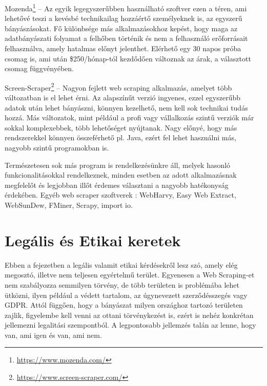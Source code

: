 Mozenda\footnote{\url{https://www.mozenda.com/}} – Az egyik legegyszerűbben használható szoftver ezen a téren, ami lehetővé teszi a kevésbé technikailag hozzáértő személyeknek is, az egyszerű bányászásokat. Fő különbsége más alkalmazásokhoz kepést, hogy maga az adatbányászati folyamat a felhőben történik és nem a felhasználó erőforrásait felhasználva, amely hatalmas előnyt jelenthet. Elérhető egy 30 napos próba csomag is, ami után \$250/hónap-tól kezdődően változnak az árak, a választott csomag függvényében.

Screen-Scraper\footnote{\url{https://www.screen-scraper.com/}} – Nagyon fejlett web scraping alkalmazás, amelyet több változatban is el lehet érni. Az alapszínűt verzió ingyenes, ezzel egyszerűbb adatok után lehet bányászni, könnyen kezelhető, nem kell sok technikai tudás hozzá. Más változatok, mint például a profi vagy vállalkozás szintű verziók már sokkal komplexebbek, több lehetőséget nyújtanak. Nagy előnyé, hogy más rendszerekkel könnyen összeférhető pl. Java, ezért fel lehet használni más, nagyobb szintű programokban is.


Természetesen sok más program is rendelkezésünkre áll, melyek hasonló funkcionalitásokkal rendelkeznek, minden esetben az adott alkalmazásnak megfelelőt és legjobban illőt érdemes választani a nagyobb hatékonyság érdekében. Egyéb web scraper szoftverek \cite{sirisuriya2015comparative}: WebHarvy, Easy Web Extract, WebSunDew, FMiner, Scrapy, import io. 


\section{Legális és Etikai keretek}

Ebben a fejezetben a legális valamit etikai kérdésekről lesz szó, amely elég megosztó, illetve nem teljesen egyértelmű terület. Egyenesen a Web Scraping-et nem szabályozza semmilyen törvény, de több területen is problémába lehet ütközni, ilyen például a védett tartalom, az úgynevezett szerződésszegés vagy GDPR. Attól függően, hogy a bányászat milyen országhoz tartozó területen zajlik, figyelembe kell venni az ottani törvénykezést is, ezért is nehéz konkrétan jellemezni legalitási szempontból. A legpontosabb jellemzés talán az lenne, hogy van, ami igen és van, ami nem.

